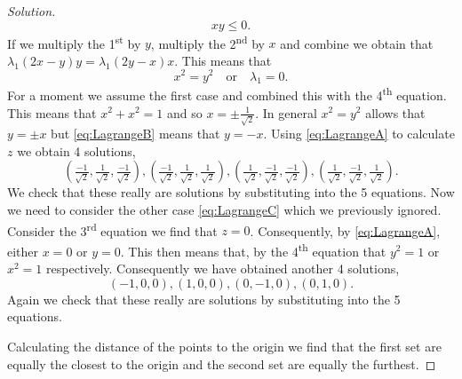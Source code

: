\begin{proof}[Solution]
    \begin{equation}
        \label{eq:LagrangeB}
        xy \leq 0.
    \end{equation}
    If we multiply the 1\textsuperscript{st} by \(y\), multiply the 2\textsuperscript{nd} by \(x\) and combine we obtain that \(\lambda_1(2x-y)y = \lambda_1(2y - x)x\).
    This means that
    \begin{equation}
        \label{eq:LagrangeC}
        x^2 = y^2 
        \quad \text{or} \quad
        \lambda_1 = 0.
    \end{equation}
    For a moment we assume the first case and combined this with the 4\textsuperscript{th} equation.
    This means that \(x^2 +x^2 = 1\) and so \(x = \pm \frac{1}{\sqrt{2}}\).
    In general \(x^2 = y^2\) allows that \(y = \pm x\) but \eqref{eq:LagrangeB} means that \(y = -x\). Using \eqref{eq:LagrangeA} to calculate \(z\) we obtain 4 solutions,
    \[
        (\tfrac{-1}{\sqrt{2}},\tfrac{1}{\sqrt{2}},\tfrac{-1}{\sqrt{2}}),
        (\tfrac{-1}{\sqrt{2}},\tfrac{1}{\sqrt{2}},\tfrac{1}{\sqrt{2}}),
        (\tfrac{1}{\sqrt{2}},\tfrac{-1}{\sqrt{2}},\tfrac{-1}{\sqrt{2}}),
        (\tfrac{1}{\sqrt{2}},\tfrac{-1}{\sqrt{2}},\tfrac{1}{\sqrt{2}}).
    \]
    We check that these really are solutions by substituting into the 5 equations.
    Now we need to consider the other case \eqref{eq:LagrangeC} which we previously ignored. 
    Consider the 3\textsuperscript{rd} equation we find that \(z = 0\). 
    Consequently, by \eqref{eq:LagrangeA}, either \(x=0\) or \(y=0\).
    This then means that, by the 4\textsuperscript{th} equation that \(y^2=1\) or \(x^2=1\) respectively.
    Consequently we have obtained another 4 solutions,
    \[
        (-1,0,0),
        (1,0,0),
        (0,-1,0),
        (0,1,0).
    \]
    Again we check that these really are solutions by substituting into the 5 equations.

    Calculating the distance of the points to the origin we find that the first set are equally the closest to the origin and the second set are equally the furthest.
\end{proof}




